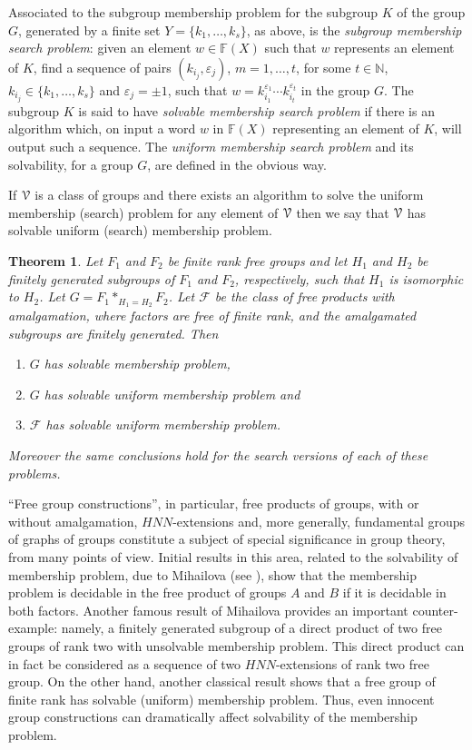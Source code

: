 \documentclass[a4paper,12pt]{article}
\newcommand{\e}{\varepsilon }
\newcommand{\cF}{{\cal{F}}}
\newcommand{\cV}{{\cal{V}}}
\newtheorem{theorem}{Theorem}[section]
\numberwithin{equation}{section}
\numberwithin{figure}{section}
\newcommand{\NN}{\ensuremath{\mathbb{N}}}
\newcommand{\FF}{\ensuremath{\mathbb{F}}}
\renewcommand{\cF}{\mathcal{F}}
\newcommand{\be}{\begin{enumerate}}
\newcommand{\ee}{\end{enumerate}}
\begin{document}
Associated to the subgroup membership problem for the subgroup $K$ of the group $G$,
generated by a finite set $Y=\{k_1,\ldots, k_s\}$, as
above, is the \emph{subgroup membership search problem}:
given an element $w\in \FF(X)$ such
that $w$ represents an element of $K$, find a sequence of pairs
$(k_{i_j},\e_j)$, $m=1,\ldots ,t$, for some $t\in \NN$, $k_{i_j}\in \{k_1,\ldots, k_s\}$
and $\e_j=\pm 1$,  such that
$w=k_{i_1}^{\e_1}\cdots k_{i_t}^{\e_t}$ in the group $G$.  The subgroup $K$
is said to have
\emph{solvable  membership search problem} if there is an algorithm which, on input
a word $w$ in $\FF(X)$ representing an element of $K$, will output such
 a sequence. The  \emph{uniform membership search problem} and
its solvability,
for a group $G$, are
defined
in the obvious way.


If $\cV$ is a class of groups and there exists an algorithm to
solve the uniform membership (search) problem for any element of $\cV$ then
we say that $\cV$ has solvable uniform  (search) membership problem.

\begin{theorem}\label{thm:membership}
Let $F_1$ and $F_2$ be finite rank free groups and let $H_1$ and $H_2$
be finitely generated subgroups of $F_1$ and $F_2$, respectively, such
that $H_1$ is isomorphic to $H_2$. Let $G=F_1 \ast_{H_1=H_2} F_2$.
Let $\cF$ be the class of free products with amalgamation, where
factors are free of finite rank, and the amalgamated subgroups are
finitely generated.
Then
\be
\item\label{it:membership}
$G$ has solvable membership problem,
\item \label{it:uni-membership}
$G$ has solvable uniform  membership problem and
\item\label{it:class-uni-membership}
$\cF$ has solvable uniform  membership problem.
\ee
Moreover the same conclusions hold for the search versions of each of these
problems.
\end{theorem}


``Free group constructions'', in particular, free products of groups,
with or without amalgamation, $HNN$-extensions
 and, more generally, fundamental groups
of graphs of groups constitute a subject of special significance in
group theory, from many points of view. Initial results in this area,
related to the solvability of membership problem,  due to Mihailova (see
\cite{mi59,mi68}), show that the membership problem is
decidable in the free product of groups $A$ and $B$ if it is decidable
in both factors. Another famous result of
Mihailova \cite{mi58}  provides an important counter-example:
 namely,  a finitely generated
subgroup of a direct product of two free groups of rank two with
unsolvable membership problem.  This direct
product can in fact be considered as a sequence of two $HNN$-extensions
of rank two free group. On the other hand, another classical
result \cite[Proposition 2.21]{LS} shows that a free group of finite rank has
solvable (uniform)
membership problem. Thus,  even innocent group
constructions can dramatically affect solvability of the membership problem.
\end{document}
